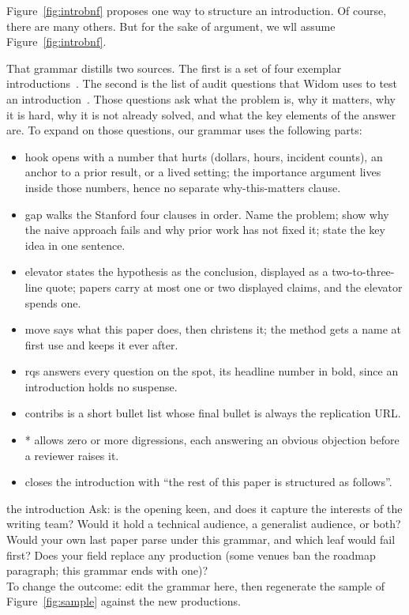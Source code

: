 Figure~\ref{fig:introbnf} proposes one 
way to structure an introduction.
Of course,
there are many others.
But for the sake of argument, 
we wll assume Figure~\ref{fig:introbnf}.

That grammar distills two sources.
The first is a set of four exemplar
introductions~\cite{shannon40,kocaguneli12,fu17,ladisa23}.
The second is the list of audit questions that Widom uses to test
an introduction~\cite{widom06}.
Those questions ask what the problem is, why it matters, why it
is hard, why it is not already solved, and what the key elements
of the answer are.
To expand on those questions, our grammar uses the following parts:
\begin{itemize}
\item {\ttfamily hook} opens with a number that hurts (dollars,
hours, incident counts), an anchor to a prior result, or a lived
setting; the importance argument lives inside those numbers,
hence no separate why-this-matters clause.
\item {\ttfamily gap} walks the Stanford four clauses in order.
Name the problem; show why the naive approach fails and why
prior work has not fixed it; state the key idea in one sentence.
\item {\ttfamily elevator} states the hypothesis as the
conclusion, displayed as a two-to-three-line quote; papers carry
at most one or two displayed claims, and the elevator spends
one.
\item {\ttfamily move} says what this paper does, then christens
it; the method gets a name at first use and keeps it ever after.
\item {\ttfamily rqs} answers every question on the spot, its
headline number in bold, since an introduction holds no suspense.
\item {\ttfamily contribs} is a short bullet list whose final
bullet is always the replication URL.
\item {\ttfamily [caveat]*} allows zero or more digressions, each
answering an obvious objection before a reviewer raises it.
\item {\ttfamily [roadmap]} closes the introduction with ``the rest
of this paper is structured as follows''.
\end{itemize}

\begin{pause}{the introduction}
Ask: is the opening keen, and does it capture the interests of the
writing team?
Would it hold a technical audience, a generalist audience, or both?
Would your own last paper parse under this grammar, and which leaf
would fail first?
Does your field replace any production (some venues ban the
roadmap paragraph; this grammar ends with one)?\\[0.2em]
To change the outcome: edit the grammar here, then regenerate the
sample of Figure~\ref{fig:sample} against the new productions.
\end{pause}

